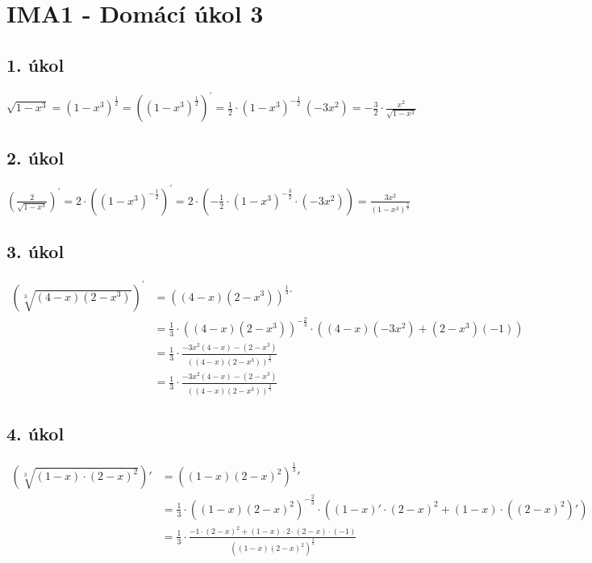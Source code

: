 \documentclass[a4paper,11pt,twocolumn]{article}
\begin{document}
    \section{IMA1 - Domácí úkol 3}

    \subsection*{1. úkol}
    $\sqrt{1-x^3} = (1-x^3)^{\frac{1}{2}} = \left((1-x^3)^{\frac{1}{2}}\right)^\prime = \frac{1}{2} \cdot (1 - x^3)^{-\frac{1}{2}} \ (-3x^2) = -\frac{3}{2}\cdot\frac{x^2}{\sqrt{1-x^3}}$


    \subsection*{2. úkol}
    $\left(\frac{2}{\sqrt{1 - x^3}}\right)^\prime = 2 \cdot \left((1 - x^3)^{-\frac{1}{2}}\right)^\prime = 2 \cdot \left(-\frac{1}{2} \cdot (1 - x^3)^{-\frac{3}{2}} \cdot (-3x^2)\right) = \frac{3x^2}{(1 - x^3)^{\frac{3}{2}}}$

    \subsection*{3. úkol}
    \begin{align*}
    \left( \sqrt[3]{(4 - x)(2 - x^3)} \right)^\prime &= \left( (4 - x)(2 - x^3) \right)^{\frac{1}{3}}{}^\prime \\
    &= \frac{1}{3} \cdot \left((4 - x)(2 - x^3)\right)^{-\frac{2}{3}} \cdot \left((4 - x)(-3x^2) + (2 - x^3)(-1)\right) \\
    &= \frac{1}{3} \cdot \frac{-3x^2(4 - x) - (2 - x^3)}{\left((4 - x)(2 - x^3)\right)^{\frac{2}{3}}} \\
    &= \frac{1}{3} \cdot \frac{-3x^2(4 - x) - (2 - x^3)}{\left((4 - x)(2 - x^3)\right)^{\frac{2}{3}}}
    \end{align*}

    \subsection*{4. úkol}
\begin{align*}
\left( \sqrt[3]{(1 - x)\cdot(2 - x)^2} \right)' &= \left( (1 - x)(2 - x)^2 \right)^{\frac{1}{3}}{}' \\
&= \frac{1}{3} \cdot \left((1 - x)(2 - x)^2\right)^{-\frac{2}{3}} \cdot \left( (1 - x)' \cdot (2 - x)^2 + (1 - x) \cdot \left( (2 - x)^2 \right)' \right) \\
&= \frac{1}{3} \cdot \frac{-1 \cdot (2 - x)^2 + (1 - x) \cdot 2 \cdot (2 - x) \cdot (-1)}{((1 - x)(2 - x)^2)^{\frac{2}{3}}}
\end{align*}
\end{document}
